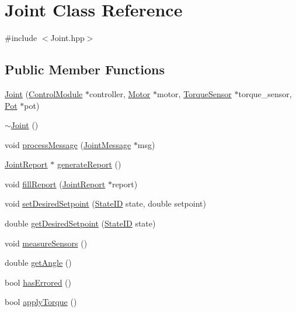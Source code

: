 \hypertarget{classJoint}{}\section{Joint Class Reference}
\label{classJoint}


{\ttfamily \#include $<$Joint.\+hpp$>$}

\subsection*{Public Member Functions}
\begin{DoxyCompactItemize}
\item 
\hyperlink{classJoint_a2e5c866dcb711094af82278e4d44d8b2}{Joint} (\hyperlink{classControlModule}{Control\+Module} $\ast$controller, \hyperlink{classMotor}{Motor} $\ast$motor, \hyperlink{classTorqueSensor}{Torque\+Sensor} $\ast$torque\+\_\+sensor, \hyperlink{classPot}{Pot} $\ast$pot)
\item 
\hyperlink{classJoint_a42aca0bd1832136984923713127c28f1}{$\sim$\+Joint} ()
\item 
void \hyperlink{classJoint_a33729eeab4588211b7cbe753fb049d59}{process\+Message} (\hyperlink{classJointMessage}{Joint\+Message} $\ast$msg)
\item 
\hyperlink{classJointReport}{Joint\+Report} $\ast$ \hyperlink{classJoint_a65c605e61d6e1998d71a3580896ca523}{generate\+Report} ()
\item 
void \hyperlink{classJoint_aba8104e0e6b09058c7a744a805bbfa7f}{fill\+Report} (\hyperlink{classJointReport}{Joint\+Report} $\ast$report)
\item 
void \hyperlink{classJoint_ae1e7cbd5ec6ff5f8fd8a917b154a0a68}{set\+Desired\+Setpoint} (\hyperlink{States_8hpp_a26aafbeccd8f356b39e1809f1ab9cfdc}{State\+ID} state, double setpoint)
\item 
double \hyperlink{classJoint_a69a208e0b5e673d335c06d943534724d}{get\+Desired\+Setpoint} (\hyperlink{States_8hpp_a26aafbeccd8f356b39e1809f1ab9cfdc}{State\+ID} state)
\item 
void \hyperlink{classJoint_af9071b64d69bd951e215f0cf4af7b919}{measure\+Sensors} ()
\item 
double \hyperlink{classJoint_ae0204ef60dd8506dbdb94a65faa188fb}{get\+Angle} ()
\item 
bool \hyperlink{classJoint_a7fb5248914eb948e6addb4e1398c0819}{has\+Errored} ()
\item 
bool \hyperlink{classJoint_a47129449e8b008732e28b4bb0bc52643}{apply\+Torque} ()
\item 

\end{DoxyCompactItemize}
